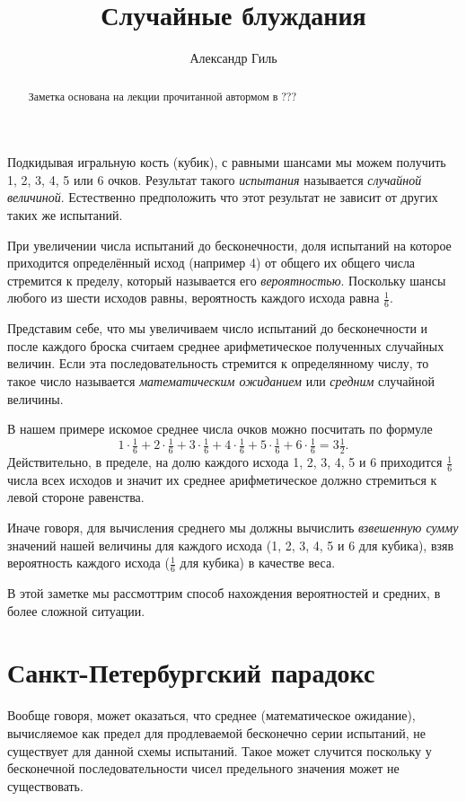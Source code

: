 \documentclass{article}
\begin{document}
\title{Случайные блуждания}
\author{Александр Гиль}
\date{}
\maketitle
\begin{abstract}
Заметка основана на лекции прочитанной автормом в ??? 
\end{abstract}

Подкидывая игральную кость (кубик),
с равными шансами мы можем получить 1, 2, 3, 4, 5 или 6 очков.
Результат такого \emph{испытания} называется \emph{случайной величиной}.
Естественно предположить что этот результат не зависит от других таких же испытаний.

При увеличении числа испытаний до бесконечности,
доля испытаний на которое приходится определённый исход (например 4)
от общего их общего числа 
стремится к пределу, 
который называется его \emph{вероятностью}.
Поскольку шансы любого из шести исходов равны,
вероятность каждого исхода равна $\tfrac16$.

Представим себе, что мы увеличиваем число испытаний до бесконечности
и после каждого броска считаем среднее арифметическое полученных случайных величин.
Если эта последовательность стремится к определянному числу,
то такое число называется \emph{математическим ожиданием} или \emph{средним} случайной величины.

В нашем примере искомое среднее числа очков можно посчитать по формуле
\[1\cdot\tfrac16+2\cdot\tfrac16+3\cdot\tfrac16+4\cdot\tfrac16+5\cdot\tfrac16+6\cdot\tfrac16=3\tfrac12.\]
Действительно, в пределе, 
на долю каждого исхода 1, 2, 3, 4, 5 и 6
приходится $\tfrac16$ числа всех исходов
и значит их среднее арифметическое должно 
стремиться к левой стороне равенства.

Иначе говоря, для вычисления среднего мы должны вычислить \emph{взвешенную сумму} значений нашей величины для каждого исхода
(1, 2, 3, 4, 5 и 6 для кубика), 
взяв вероятность каждого исхода ($\tfrac16$ для кубика)
в качестве веса.

В этой заметке мы рассмоттрим способ нахождения 
вероятностей и средних, в более сложной ситуации.
 
 \section{Санкт-Петербургский парадокс}

Вообще говоря, может оказаться, что среднее (математическое ожидание), вычисляемое как предел для продлеваемой бесконечно серии испытаний, не существует для данной схемы испытаний.
Такое может случится поскольку у бесконечной последовательности чисел предельного значения может не существовать. 
\end{document}
